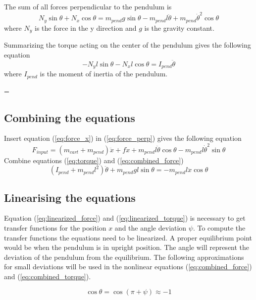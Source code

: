 \begin{appendices}
The sum of all forces perpendicular to the pendulum is
\begin{equation}
	N_y \sin \theta + N_x \cos \theta = m_{pend} g \sin \theta - m_{pend} l \ddot{\theta} + m_{pend} \dot{\theta}^2 \cos \theta \label{eq:force_perp}
\end{equation}
where $N_y$ is the force in the y direction and $g$ is the gravity constant.

Summarizing the torque acting on the center of the pendulum gives the following equation
\begin{equation}
	- N_y l \sin \theta - N_x l \cos \theta = I_{pend} \ddot{\theta} \label{eq:torque}
\end{equation}
where $I_{pend}$ is the moment of inertia of the pendulum.



=\subsection{Combining the equations} \label{appendix:graph}
Insert equation (\ref{eq:force_x}) in (\ref{eq:force_perp}) gives the following equation
\begin{equation}
	F_{input} = (m_{cart} + m_{pend}) \ddot{x} + f \dot{x} + m_{pend} l \ddot{\theta} \cos \theta - m_{pend} l \dot{\theta}^2 \sin \theta \label{eq:combined_force}
\end{equation}
Combine equations (\ref{eq:torque}) and (\ref{eq:combined_force})
\begin{equation}
	(I_{pend} + m_{pend} l^2) \ddot{\theta} + m_{pend} g l \sin \theta = -m_{pend} l \ddot{x} \cos \theta \label{eq:combined_torque}
\end{equation}


\subsection{Linearising the equations}
Equation (\ref{eq:linearized_force}) and (\ref{eq:linearized_torque}) is necessary to get transfer functions for the position $x$ and the angle deviation $\psi$. To compute the transfer functions the equations need to be linearized. A proper equilibrium point would be when the pendulum is in upright position. The angle will represent the deviation of the pendulum from the equilibrium. The following approximations for small deviations will be used in the nonlinear equations (\ref{eq:combined_force}) and (\ref{eq:combined_torque}).

\begin{equation}
	\cos \theta = \cos(\pi + \psi) \approx -1 \label{eq:cos_approx}
\end{equation}


\end{appendices}
